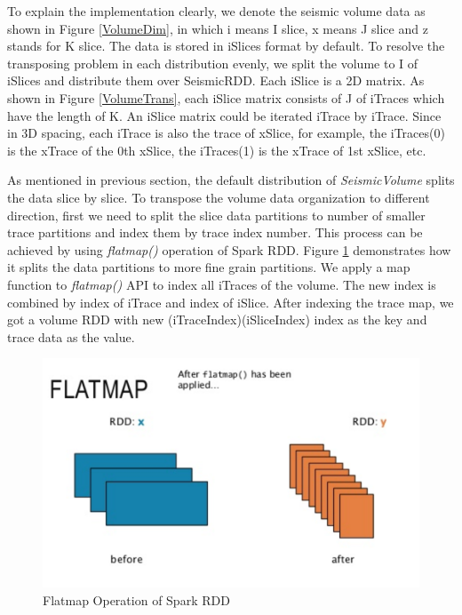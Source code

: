 To explain the implementation clearly, we denote the seismic volume data as shown in Figure \ref{VolumeDim}, in which i means I slice, x means J slice and z stands for K slice. The data is stored in iSlices format by default. To resolve the transposing problem in each distribution evenly, we split the volume to I of iSlices and distribute them over SeismicRDD. Each iSlice is a 2D matrix. As shown in Figure \ref{VolumeTrans}, each iSlice matrix consists of J of iTraces which have the length of K. An iSlice matrix could be iterated iTrace by iTrace. Since in 3D spacing, each iTrace is also the trace of xSlice, for example, the iTraces(0) is the xTrace of the 0th xSlice, the iTraces(1) is the xTrace of 1st xSlice, etc. 

As mentioned in previous section, the default distribution of \emph{SeismicVolume} splits the data slice by slice. To transpose the volume data organization to different direction,  first we need to split the slice data partitions to number of smaller trace partitions and index them by trace index number. This process can be achieved by using \emph{flatmap()} operation of Spark RDD. Figure \ref{RDDFlatmap} demonstrates how it splits the data partitions to more fine grain partitions. We apply a map function to \emph{flatmap()} API to index all iTraces of the volume. The new index is combined by index of iTrace and index of iSlice. After indexing the trace map, we got a volume RDD with new (iTraceIndex)(iSliceIndex) index as the key and trace data as the value.

\begin{figure}[h]
\centering
\includegraphics[scale=0.8]{figures/RDDFlatmap.png}
\caption{Flatmap Operation of Spark RDD}
\label{RDDFlatmap}
\end{figure}


